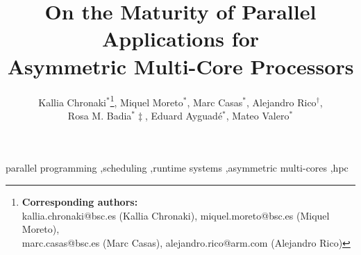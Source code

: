 \documentclass[preprint,12pt]{elsarticle}
\begin{document}
\begin{frontmatter}



\title{On the Maturity of Parallel Applications for \\ Asymmetric Multi-Core 
Processors}


\author{Kallia Chronaki$^\ast$\footnote{\textbf{Corresponding authors:\\} kallia.chronaki@bsc.es (Kallia Chronaki), miquel.moreto@bsc.es (Miquel Moreto), \\marc.casas@bsc.es (Marc Casas), alejandro.rico@arm.com (Alejandro Rico)}, Miquel Moreto$^\ast$, Marc Casas$^\ast$, Alejandro Rico$^\dag$, \\Rosa M. Badia$^\ast\ddag$, Eduard Ayguad{\'e}$^\ast$, Mateo Valero$^\ast$}

\address{$^\ast$Barcelona Supercomputing Center, \\$^\dag$ARM, \\$^\ddag$Artificial Intelligence
Research Institute (IIIA) - \\Spanish National Research Council
(CSIC)}

\begin{abstract}

\end{abstract}

\begin{keyword}
parallel programming \sep scheduling \sep runtime systems \sep asymmetric multi-cores \sep hpc



\end{keyword}

\end{frontmatter}
\end{document}
